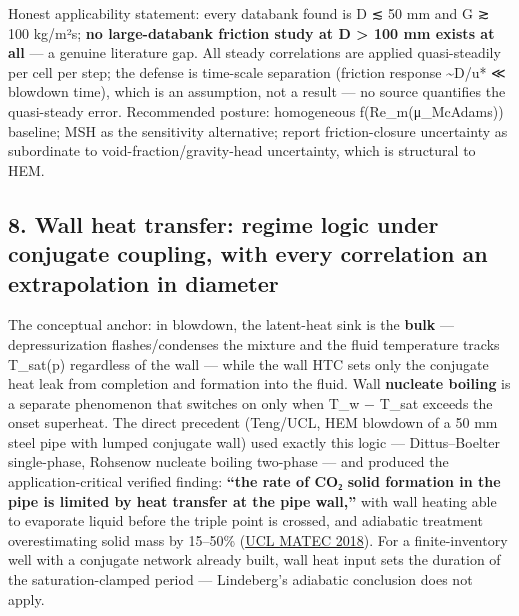 Honest applicability statement: every databank found is D ≲ 50 mm and G
≳ 100 kg/m²s; \textbf{no large-databank friction study at D
\textgreater{} 100 mm exists at all} --- a genuine literature gap. All
steady correlations are applied quasi-steadily per cell per step; the
defense is time-scale separation (friction response \textasciitilde D/u*
≪ blowdown time), which is an assumption, not a result --- no source
quantifies the quasi-steady error. Recommended posture: homogeneous
f(Re\_m(μ\_McAdams)) baseline; MSH as the sensitivity alternative;
report friction-closure uncertainty as subordinate to
void-fraction/gravity-head uncertainty, which is structural to HEM.

\hypertarget{wall-heat-transfer-regime-logic-under-conjugate-coupling-with-every-correlation-an-extrapolation-in-diameter}{%
\subsection{8. Wall heat transfer: regime logic under conjugate
coupling, with every correlation an extrapolation in
diameter}\label{wall-heat-transfer-regime-logic-under-conjugate-coupling-with-every-correlation-an-extrapolation-in-diameter}}

The conceptual anchor: in blowdown, the latent-heat sink is the
\textbf{bulk} --- depressurization flashes/condenses the mixture and the
fluid temperature tracks T\_sat(p) regardless of the wall --- while the
wall HTC sets only the conjugate heat leak from completion and formation
into the fluid. Wall \textbf{nucleate boiling} is a separate phenomenon
that switches on only when T\_w − T\_sat exceeds the onset superheat.
The direct precedent (Teng/UCL, HEM blowdown of a 50 mm steel pipe with
lumped conjugate wall) used exactly this logic --- Dittus--Boelter
single-phase, Rohsenow nucleate boiling two-phase --- and produced the
application-critical verified finding: \textbf{``the rate of CO₂ solid
formation in the pipe is limited by heat transfer at the pipe wall,''}
with wall heating able to evaporate liquid before the triple point is
crossed, and adiabatic treatment overestimating solid mass by 15--50\%
(\href{https://discovery-pp.ucl.ac.uk/id/eprint/10064608/1/matecconf_icchmt2018_01026.pdf}{UCL
MATEC 2018}). For a finite-inventory well with a conjugate network
already built, wall heat input sets the duration of the
saturation-clamped period --- Lindeberg's adiabatic conclusion does not
apply.


